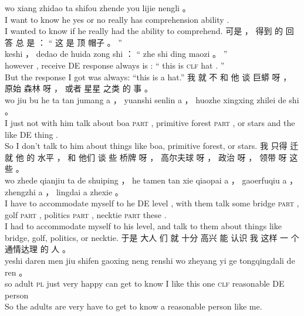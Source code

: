 \documentclass[UTF8]{ctexart}
\begin{document}
\begin{exe}
wo xiang zhidao ta shifou zhende you lijie nengli 。
\\
I {want to} know he {yes or no} really has comprehension ability .
\\
\trans I wanted to know if he really had the ability to comprehend. 
\ex
\glll
可是 ， 得到 的 回答 总 是 ： “ 这 是 顶 帽子 。 ”
\\
keshi ， dedao de huida zong shi ： “ zhe shi ding maozi 。 ”
\\
however , receive DE response always is : `` this is \textsc{clf} hat . ''
\\
\trans But the response I got was always: ``this is a hat.''
\ex
\glll
我 就 不 和 他 谈 巨蟒 呀 ， 原始 森林 呀 ， 或者 星星 之类 的 事 。
\\
wo jiu bu he ta tan jumang a ， yuanshi senlin a ， huozhe xingxing zhilei de shi 。
\\
I just not with him {talk about} boa \textsc{part} , primitive forest \textsc{part} , or stars {and the like} DE thing .
\\
\trans So I don't talk to him about things like boa, primitive forest, or stars. 
\ex
\glll
我 只得 迁就 他 的 水平 ， 和 他们 谈 些 桥牌 呀 ， 高尔夫球 呀 ， 政治 呀 ， 领带 呀 这些 。
\\
wo zhede qianjiu ta de shuiping ， he tamen tan xie qiaopai a ， gaoerfuqiu a ， zhengzhi a ， lingdai a zhexie 。
\\
I {have to} {accommodate myself to} he DE level , with them  talk some bridge \textsc{part} , golf \textsc{part} , politics \textsc{part} , necktie \textsc{part} these .
\\
\trans I had to accommodate myself to his level, and talk to them about things like bridge, golf, politics, or necktie. 
\ex
\glll
于是 大人 们 就 十分 高兴 能 认识 我 这样 一 个 通情达理 的 人 。
\\
yeshi daren men jiu shifen gaoxing neng renshi wo zheyang yi ge tongqingdali de ren 。
\\
so adult \textsc{pl} just very happy can {get to know} I  {like this} one \textsc{clf} reasonable DE person
\\
\trans So the adults are very have to get to know a reasonable person like me. 
\end{exe}
\end{document}

